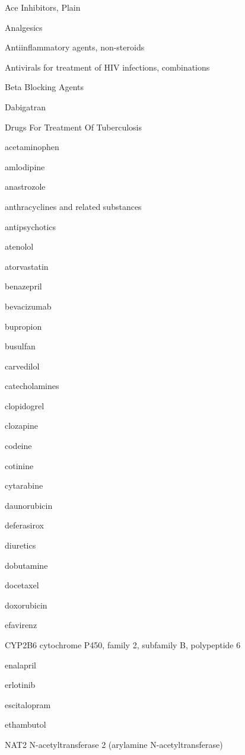 \documentclass{resume} %
\begin{document}
\begin{rSection}{ Ace Inhibitors, Plain }
\begin{rSection}{ Analgesics }
\begin{rSection}{ Antiinflammatory agents, non-steroids }
\begin{rSection}{ Antivirals for treatment of HIV infections, combinations }
\begin{rSection}{ Beta Blocking Agents }
\begin{rSection}{ Dabigatran }
\begin{rSection}{ Drugs For Treatment Of Tuberculosis }
\begin{rSection}{ acetaminophen }
\begin{rSection}{ amlodipine }
\begin{rSection}{ anastrozole }
\begin{rSection}{ anthracyclines and related substances }
\begin{rSection}{ antipsychotics }
\begin{rSection}{ atenolol }
\begin{rSection}{ atorvastatin }
\begin{rSection}{ benazepril }
\begin{rSection}{ bevacizumab }
\begin{rSection}{ bupropion }
\begin{rSection}{ busulfan }
\begin{rSection}{ carvedilol }
\begin{rSection}{ catecholamines }
\begin{rSection}{ clopidogrel }
\begin{rSection}{ clozapine }
\begin{rSection}{ codeine }
\begin{rSection}{ cotinine }
\begin{rSection}{ cytarabine }
\begin{rSection}{ daunorubicin }
\begin{rSection}{ deferasirox }
\begin{rSection}{ diuretics }
\begin{rSection}{ dobutamine }
\begin{rSection}{ docetaxel }
\begin{rSection}{ doxorubicin }
\begin{rSection}{ efavirenz }
\begin{rSubsection}{ CYP2B6 }{ cytochrome P450, family 2, subfamily B, polypeptide 6 }{}{}
\item[]

\end{rSubsection}
\end{rSection}\begin{rSection}{ enalapril }
\item[]
\begin{rSection}{ erlotinib }
\item[]
\begin{rSection}{ escitalopram }
\item[]
\begin{rSection}{ ethambutol }
\item[]
\begin{rSubsection}{ NAT2 }{ N-acetyltransferase 2 (arylamine N-acetyltransferase) }{}{}
\item[]


\end{rSubsection}
\end{rSection}
\end{rSection}
\end{rSection}
\end{rSection}
\end{rSection}
\end{rSection}
\end{rSection}
\end{rSection}
\end{rSection}
\end{rSection}
\end{rSection}
\end{rSection}
\end{rSection}
\end{rSection}
\end{rSection}
\end{rSection}
\end{rSection}
\end{rSection}
\end{rSection}
\end{rSection}
\end{rSection}
\end{rSection}
\end{rSection}
\end{rSection}
\end{rSection}
\end{rSection}
\end{rSection}
\end{rSection}
\end{rSection}
\end{rSection}
\end{rSection}
\end{rSection}
\end{rSection}
\end{rSection}
\end{rSection}
\end{document}
